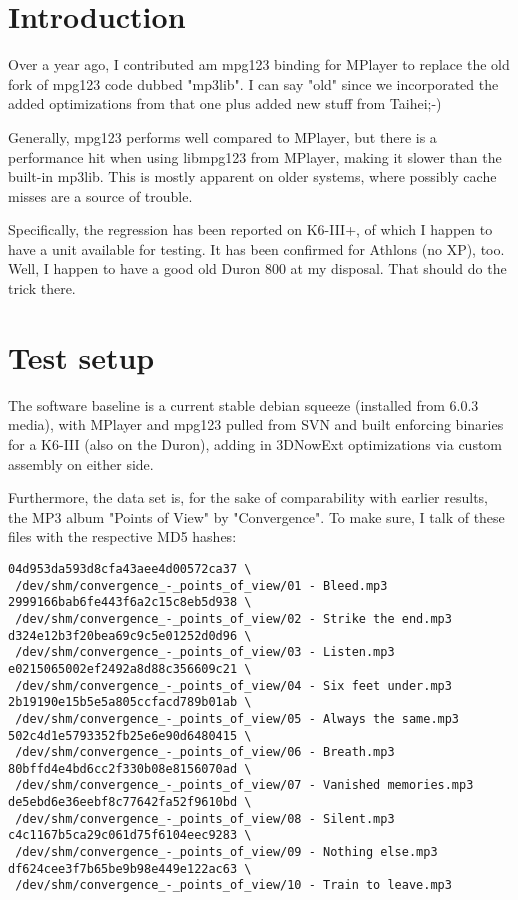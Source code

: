 \documentclass[a4paper,12pt]{scrartcl}
\begin{document}
\setlength{\parindent}{0pt}
\setlength{\parskip}{0.5em}


\tableofcontents

\section{Introduction}

Over a year ago, I contributed am mpg123 binding for MPlayer to replace the old fork of mpg123 code dubbed "mp3lib". I can say "old" since we incorporated the added optimizations from that one plus added new stuff from Taihei;-)

Generally, mpg123 performs well compared to MPlayer, but there is a performance hit when using libmpg123 from MPlayer, making it slower than the built-in mp3lib. This is mostly apparent on older systems, where possibly cache misses are a source of trouble.

Specifically, the regression has been reported on K6-III+, of which I happen to have a unit available for testing. It has been confirmed for Athlons (no XP), too. Well, I happen to have a good old Duron 800 at my disposal. That should do the trick there.

\section{Test setup}

The software baseline is a current stable debian squeeze (installed from 6.0.3 media), with MPlayer and mpg123 pulled from SVN and built enforcing binaries for a K6-III (also on the Duron), adding in 3DNowExt optimizations via custom assembly on either side.

Furthermore, the data set is, for the sake of comparability with earlier results, the MP3 album "Points of View" by "Convergence". To make sure, I talk of these files with the respective MD5 hashes:

\begin{verbatim}
04d953da593d8cfa43aee4d00572ca37 \
 /dev/shm/convergence_-_points_of_view/01 - Bleed.mp3
2999166bab6fe443f6a2c15c8eb5d938 \
 /dev/shm/convergence_-_points_of_view/02 - Strike the end.mp3
d324e12b3f20bea69c9c5e01252d0d96 \
 /dev/shm/convergence_-_points_of_view/03 - Listen.mp3
e0215065002ef2492a8d88c356609c21 \
 /dev/shm/convergence_-_points_of_view/04 - Six feet under.mp3
2b19190e15b5e5a805ccfacd789b01ab \
 /dev/shm/convergence_-_points_of_view/05 - Always the same.mp3
502c4d1e5793352fb25e6e90d6480415 \
 /dev/shm/convergence_-_points_of_view/06 - Breath.mp3
80bffd4e4bd6cc2f330b08e8156070ad \
 /dev/shm/convergence_-_points_of_view/07 - Vanished memories.mp3
de5ebd6e36eebf8c77642fa52f9610bd \
 /dev/shm/convergence_-_points_of_view/08 - Silent.mp3
c4c1167b5ca29c061d75f6104eec9283 \
 /dev/shm/convergence_-_points_of_view/09 - Nothing else.mp3
df624cee3f7b65be9b98e449e122ac63 \
 /dev/shm/convergence_-_points_of_view/10 - Train to leave.mp3
\end{verbatim}
\end{document}

